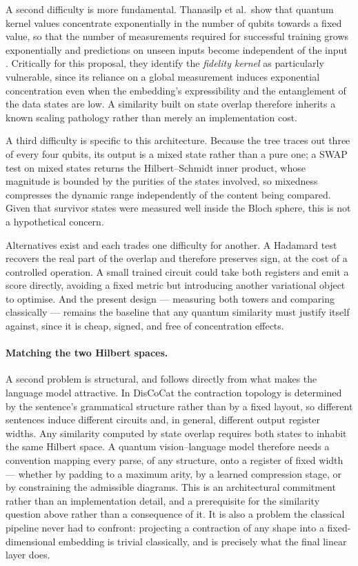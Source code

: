 \documentclass[12pt, a4paper, oneside]{report}
\begin{document}
A second difficulty is more fundamental. Thanasilp et al.\ show that quantum
kernel values concentrate exponentially in the number of qubits towards a fixed
value, so that the number of measurements required for successful training
grows exponentially and predictions on unseen inputs become independent of the
input \cite{thanasilp2024concentration}. Critically for this proposal, they
identify the \emph{fidelity kernel} as particularly vulnerable, since its
reliance on a global measurement induces exponential concentration even when the
embedding's expressibility and the entanglement of the data states are low. A
similarity built on state overlap therefore inherits a known scaling pathology
rather than merely an implementation cost.

A third difficulty is specific to this architecture. Because the tree traces out
three of every four qubits, its output is a mixed state rather than a pure one;
a SWAP test on mixed states returns the Hilbert--Schmidt inner product, whose
magnitude is bounded by the purities of the states involved, so mixedness
compresses the dynamic range independently of the content being compared. Given
that survivor states were measured well inside the Bloch sphere, this is not a
hypothetical concern.

Alternatives exist and each trades one difficulty for another. A Hadamard test
recovers the real part of the overlap and therefore preserves sign, at the cost
of a controlled operation. A small trained circuit could take both registers and
emit a score directly, avoiding a fixed metric but introducing another
variational object to optimise. And the present design --- measuring both towers
and comparing classically --- remains the baseline that any quantum similarity
must justify itself against, since it is cheap, signed, and free of
concentration effects.

\paragraph{Matching the two Hilbert spaces.} A second problem is structural, and
follows directly from what makes the language model attractive. In DisCoCat the
contraction topology is determined by the sentence's grammatical structure
rather than by a fixed layout, so different sentences induce different circuits
and, in general, different output register widths. Any similarity computed by
state overlap requires both states to inhabit the same Hilbert space. A quantum
vision--language model therefore needs a convention mapping every parse, of any
structure, onto a register of fixed width --- whether by padding to a maximum
arity, by a learned compression stage, or by constraining the admissible
diagrams. This is an architectural commitment rather than an implementation
detail, and a prerequisite for the similarity question above rather than a
consequence of it. It is also a problem the classical pipeline never had to
confront: projecting a contraction of any shape into a fixed-dimensional
embedding is trivial classically, and is precisely what the final linear layer
does.
\end{document}
